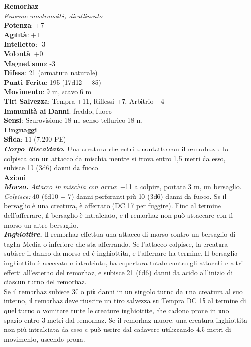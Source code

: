 \begin{multicols}{2}
\medskip\textbf{Remorhaz}\\
\emph{Enorme mostruosità, disallineato}\\
\textbf{Potenza}: +7\\
\textbf{Agilità}: +1\\
\textbf{Intelletto}: -3\\
\textbf{Volontà}: +0\\
\textbf{Magnetismo}: -3\\
\textbf{Difesa}: 21 (armatura naturale)\\
\textbf{Punti Ferita}: 195 (17d12 + 85)\\
\textbf{Movimento}: 9 m, scavo 6 m\\
\textbf{Tiri Salvezza}: Tempra +11, Riflessi +7, Arbitrio +4\\
\textbf{Immunità ai Danni}: freddo, fuoco\\
\textbf{Sensi}: Scurovisione 18 m, senso tellurico 18 m\\
\textbf{Linguaggi} -\\
\textbf{Sfida}: 11 (7.200 PE)\smallskip\\
\emph{\textbf{Corpo Riscaldato.}} Una creatura che entri a contatto con il remorhaz o lo colpisca con un attacco da mischia mentre si trova entro 1,5 metri da esso, subisce 10 (3d6) danni da fuoco.\\
\smallskip\textbf{Azioni}\\
\emph{\textbf{Morso.} Attacco in mischia con arma}: +11 a colpire, portata 3 m, un bersaglio.\\
\emph{Colpisce:} 40 (6d10 + 7) danni perforanti più 10 (3d6) danni da fuoco. Se il bersaglio è una creatura, è afferrato (DC 17 per fuggire). Fino al termine dell'afferrare, il bersaglio è intralciato, e il remorhaz non può attaccare con il morso un altro bersaglio.\\
\emph{\textbf{Inghiottire.}} Il remorhaz effettua una attacco di morso contro un bersaglio di taglia Media o inferiore che sta afferrando. Se l'attacco colpisce, la creatura subisce il danno da morso ed è inghiottita, e l'afferrare ha termine. Il bersaglio inghiottito è accecato e intralciato, ha copertura totale contro gli attacchi e altri effetti all'esterno del remorhaz, e subisce 21 (6d6) danni da acido all'inizio di ciascun turno del remorhaz.\\
Se il remorhaz subisce 30 o più danni in un singolo turno da una creatura al suo interno, il remorhaz deve riuscire un tiro salvezza su Tempra DC 15 al termine di quel turno o vomitare tutte le creature inghiottite, che cadono prone in uno spazio entro 3 metri dal remorhaz. Se il remorhaz muore, una creatura inghiottita non più intralciata da esso e può uscire dal cadavere utilizzando 4,5 metri di movimento, uscendo prona.\\

\end{multicols}
